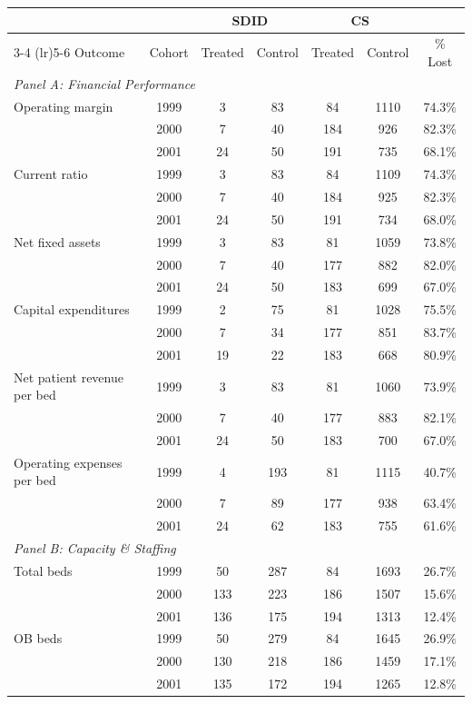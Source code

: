 \begin{tabular}{l c cc cc c}
\toprule
 & & \multicolumn{2}{c}{SDID} & \multicolumn{2}{c}{CS} & \\
\cmidrule(lr){3-4} \cmidrule(lr){5-6}
Outcome & Cohort & Treated & Control & Treated & Control & \% Lost \\
\midrule
\multicolumn{7}{l}{\textit{Panel A: Financial Performance}} \\
Operating margin & 1999 & 3 & 83 & 84 & 1110 & 74.3\% \\
 & 2000 & 7 & 40 & 184 & 926 & 82.3\% \\
 & 2001 & 24 & 50 & 191 & 735 & 68.1\% \\
Current ratio & 1999 & 3 & 83 & 84 & 1109 & 74.3\% \\
 & 2000 & 7 & 40 & 184 & 925 & 82.3\% \\
 & 2001 & 24 & 50 & 191 & 734 & 68.0\% \\
Net fixed assets & 1999 & 3 & 83 & 81 & 1059 & 73.8\% \\
 & 2000 & 7 & 40 & 177 & 882 & 82.0\% \\
 & 2001 & 24 & 50 & 183 & 699 & 67.0\% \\
Capital expenditures & 1999 & 2 & 75 & 81 & 1028 & 75.5\% \\
 & 2000 & 7 & 34 & 177 & 851 & 83.7\% \\
 & 2001 & 19 & 22 & 183 & 668 & 80.9\% \\
Net patient revenue per bed & 1999 & 3 & 83 & 81 & 1060 & 73.9\% \\
 & 2000 & 7 & 40 & 177 & 883 & 82.1\% \\
 & 2001 & 24 & 50 & 183 & 700 & 67.0\% \\
Operating expenses per bed & 1999 & 4 & 193 & 81 & 1115 & 40.7\% \\
 & 2000 & 7 & 89 & 177 & 938 & 63.4\% \\
 & 2001 & 24 & 62 & 183 & 755 & 61.6\% \\
\midrule
\multicolumn{7}{l}{\textit{Panel B: Capacity \& Staffing}} \\
Total beds & 1999 & 50 & 287 & 84 & 1693 & 26.7\% \\
 & 2000 & 133 & 223 & 186 & 1507 & 15.6\% \\
 & 2001 & 136 & 175 & 194 & 1313 & 12.4\% \\
OB beds & 1999 & 50 & 279 & 84 & 1645 & 26.9\% \\
 & 2000 & 130 & 218 & 186 & 1459 & 17.1\% \\
 & 2001 & 135 & 172 & 194 & 1265 & 12.8\% \\

\end{tabular}

